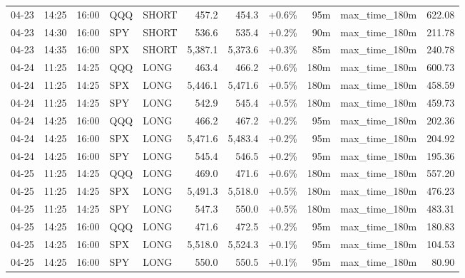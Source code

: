\documentclass[11pt,a4paper,twoside]{article}
\begin{document}
\begin{center}
\begin{longtable}{>{\color{txtmain}}l l l l l r r r r >{\color{txtmain}}l r}
04-23 & 14:25 & 16:00 & QQQ & SHORT & 457.2 & 454.3 & \textcolor{wingreen}{+0.6\%} & 95m & max\_time\_180m & \textcolor{wingreen}{622.08} \\
04-23 & 14:30 & 16:00 & SPY & SHORT & 536.6 & 535.4 & \textcolor{wingreen}{+0.2\%} & 90m & max\_time\_180m & \textcolor{wingreen}{211.78} \\
04-23 & 14:35 & 16:00 & SPX & SHORT & 5,387.1 & 5,373.6 & \textcolor{wingreen}{+0.3\%} & 85m & max\_time\_180m & \textcolor{wingreen}{240.78} \\
04-24 & 11:25 & 14:25 & QQQ & LONG & 463.4 & 466.2 & \textcolor{wingreen}{+0.6\%} & 180m & max\_time\_180m & \textcolor{wingreen}{600.73} \\
04-24 & 11:25 & 14:25 & SPX & LONG & 5,446.1 & 5,471.6 & \textcolor{wingreen}{+0.5\%} & 180m & max\_time\_180m & \textcolor{wingreen}{458.59} \\
04-24 & 11:25 & 14:25 & SPY & LONG & 542.9 & 545.4 & \textcolor{wingreen}{+0.5\%} & 180m & max\_time\_180m & \textcolor{wingreen}{459.73} \\
04-24 & 14:25 & 16:00 & QQQ & LONG & 466.2 & 467.2 & \textcolor{wingreen}{+0.2\%} & 95m & max\_time\_180m & \textcolor{wingreen}{202.36} \\
04-24 & 14:25 & 16:00 & SPX & LONG & 5,471.6 & 5,483.4 & \textcolor{wingreen}{+0.2\%} & 95m & max\_time\_180m & \textcolor{wingreen}{204.92} \\
04-24 & 14:25 & 16:00 & SPY & LONG & 545.4 & 546.5 & \textcolor{wingreen}{+0.2\%} & 95m & max\_time\_180m & \textcolor{wingreen}{195.36} \\
04-25 & 11:25 & 14:25 & QQQ & LONG & 469.0 & 471.6 & \textcolor{wingreen}{+0.6\%} & 180m & max\_time\_180m & \textcolor{wingreen}{557.20} \\
04-25 & 11:25 & 14:25 & SPX & LONG & 5,491.3 & 5,518.0 & \textcolor{wingreen}{+0.5\%} & 180m & max\_time\_180m & \textcolor{wingreen}{476.23} \\
04-25 & 11:25 & 14:25 & SPY & LONG & 547.3 & 550.0 & \textcolor{wingreen}{+0.5\%} & 180m & max\_time\_180m & \textcolor{wingreen}{483.31} \\
04-25 & 14:25 & 16:00 & QQQ & LONG & 471.6 & 472.5 & \textcolor{wingreen}{+0.2\%} & 95m & max\_time\_180m & \textcolor{wingreen}{180.83} \\
04-25 & 14:25 & 16:00 & SPX & LONG & 5,518.0 & 5,524.3 & \textcolor{wingreen}{+0.1\%} & 95m & max\_time\_180m & \textcolor{wingreen}{104.53} \\
04-25 & 14:25 & 16:00 & SPY & LONG & 550.0 & 550.5 & \textcolor{wingreen}{+0.1\%} & 95m & max\_time\_180m & \textcolor{wingreen}{80.90} \\

\end{longtable}
\end{center}
\end{document}
